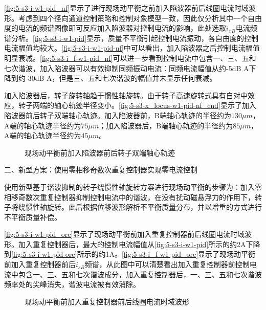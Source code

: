 \autoref{fig:5-s3-i-w1-pid_nf}显示了进行现场动平衡之前加入陷波器前后线圈电流时域波形。考虑到四个径向通道控制策略和控制对象模型一致，因此仅分析其中一个自由度的电流的频谱图像即可反应加入陷波器对控制电流的影响，此处选取$i_{xB}$电流频谱分析。\autoref{fig:5-s3-i-w1-pid}显示，质量不平衡引起控制电流振动，各自由度的控制电流幅值均较大。\autoref{fig:5-s3-i-w1-pid-nf}中可以看出，加入陷波器之后控制电流幅值明显衰减。\autoref{fig:5-s3-i_f-w1-pid_nf}可以进一步看到控制电流中包含一、三、五和七次谐波，加入陷波器可以有效抑制同频振动电流：同频电流幅值从约-5dB A下降到约-30dB A，但是三、五和七次谐波的幅值并未显示任何衰减。

加入陷波器后，转子旋转轴趋于惯性轴旋转。由于转子高速旋转式具有自对中效应，转子两端的轴心轨迹半径变小。\autoref{fig:5-s3-x_locus-w1-pid-nf_end}显示了加入陷波器前后转子双端轴心轨迹。加入陷波器前，B端轴心轨迹的半径约为$130 \mu m$，A端的轴心轨迹半径约为$75 \mu m$；加入陷波器后，B端轴心轨迹的半径约为$85 \mu m$，A端的轴心轨迹半径约为$45 \mu m$。

\begin{figure}[htb]  
	\quad  
	\caption{现场动平衡前加入陷波器前后转子双端轴心轨迹}  \label{5-s3-x_locus-w1-pid-nf_end}
\end{figure}


二、新型方案：使用零相移奇数次重复控制器实现零电流控制

使用新型基于谐波抑制的转子绕惯性轴旋转方案进行现场动平衡的步骤为：加入零相移奇数次重复控制器抑制控制电流中的谐波，在没有扰动磁悬浮力的作用下，转子将绕惯性轴旋转。此后根据位移波形解析不平衡质量分布，并以增重的方式进行不平衡质量补偿。

\autoref{fig:5-s3-i-w1-pid_orc}显示了现场动平衡前加入重复控制器前后线圈电流时域波形。加入重复控制器后，最大的控制电流幅值从\autoref{fig:5-s3-i-w1-pid}所示的约2A下降到\autoref{fig:5-s3-i-w1-pid-orc}所示的约1A。\autoref{fig:5-s3-i_f-w1-pid_orc}显示了现场动平衡前加入重复控制器前后$i_{sB}$频谱，从此图中可以清楚看出加入重复控制器前控制电流中包含一、三、五和七次谐波成分，加入重复控制器后，一、三、五和七次谐波频率处的尖峰消失，谐波电流被有效消除。

\begin{figure}[htb]  
	\quad  
	\caption{现场动平衡前加入重复控制器前后线圈电流时域波形}  \label{fig:5-s3-i-w1-pid_orc}
\end{figure}

